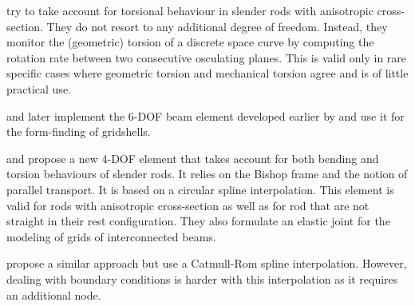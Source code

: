  try to take account for torsional behaviour in slender rods with anisotropic cross-section. They do not resort to any additional degree of freedom. Instead, they monitor the (geometric) torsion of a discrete space curve by computing the rotation rate between two consecutive osculating planes. This is valid only in rare specific cases where geometric torsion and mechanical torsion agree and is of little practical use.

 and later  implement the 6-DOF beam element developed earlier by  and use it for the form-finding of gridshells.

 and  propose a new 4-DOF element that takes account for both bending and torsion behaviours of slender rods. It relies on the Bishop frame and the notion of parallel transport. It is based on a circular spline interpolation. This element is valid for rods with anisotropic cross-section as well as for rod that are not straight in their rest configuration. They also formulate an elastic joint for the modeling of grids of interconnected beams.

 propose a similar approach but use a Catmull-Rom spline interpolation. However, dealing with boundary conditions is harder with this interpolation as it requires an additional node.
